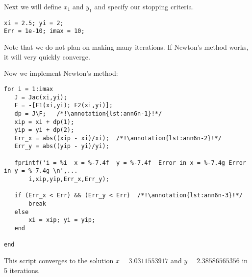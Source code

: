 \vspace{0.15cm}

\noindent Next we will define $x_1$ and $y_1$ and specify our stopping criteria.
\begin{lstlisting}[style=myMatlab,name=lec6n-ex1]
xi = 2.5; yi = 2; 
Err = 1e-10; imax = 10;
\end{lstlisting}
Note that we do not plan on making many iterations.  If Newton's method works, it will very quickly converge.

\vspace{0.25cm}

\noindent Now we implement Newton's method:
\begin{lstlisting}[style=myMatlab,name=lec6n-ex1]
for i = 1:imax
   J = Jac(xi,yi);
   F = -[F1(xi,yi); F2(xi,yi)];
   dp = J\F;   /*!\annotation{lst:ann6n-1}!*/
   xip = xi + dp(1);
   yip = yi + dp(2);
   Err_x = abs((xip - xi)/xi);  /*!\annotation{lst:ann6n-2}!*/
   Err_y = abs((yip - yi)/yi);
   
   fprintf('i = %i  x = %-7.4f  y = %-7.4f  Error in x = %-7.4g Error in y = %-7.4g \n',...
       i,xip,yip,Err_x,Err_y);
   
   if (Err_x < Err) && (Err_y < Err)  /*!\annotation{lst:ann6n-3}!*/
       break
   else
       xi = xip; yi = yip;
   end
    
end
\end{lstlisting}
This script converges to the solution $x = 3.0311553917$ and $y=2.38586565356$ in 5 iterations.

